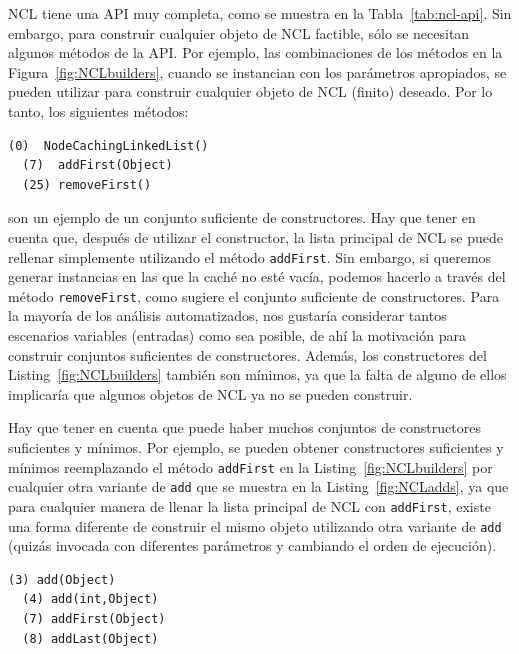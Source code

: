 NCL tiene una API muy completa, como se muestra en la Tabla~\ref{tab:ncl-api}. Sin embargo, para construir cualquier objeto de NCL factible, sólo se necesitan algunos métodos de la API. Por ejemplo, las combinaciones de los métodos en la Figura~\ref{fig:NCLbuilders}, cuando se instancian con los parámetros apropiados, se pueden utilizar para construir cualquier objeto de NCL (finito) deseado. Por lo tanto, los siguientes métodos:
\\
\begin{lstlisting}[numbers=none,label=fig:NCLbuilders, caption=Conjunto de metodos sufiente para NCL]
  (0)  NodeCachingLinkedList()
  (7)  addFirst(Object)
  (25) removeFirst()
\end{lstlisting}


 son un ejemplo de un conjunto suficiente de constructores. Hay que tener en cuenta que, después de utilizar el constructor, la lista principal de NCL se puede rellenar simplemente utilizando el método \texttt{addFirst}. Sin embargo, si queremos generar instancias en las que la caché no esté vacía, podemos hacerlo a través del método \texttt{removeFirst}, como sugiere el conjunto suficiente de constructores. Para la mayoría de los análisis automatizados, nos gustaría considerar tantos escenarios variables (entradas) como sea posible, de ahí la motivación para construir conjuntos suficientes de constructores. Además, los constructores del Listing~\ref{fig:NCLbuilders} también son mínimos, ya que la falta de alguno de ellos implicaría que algunos objetos de NCL ya no se pueden construir.

Hay que tener en cuenta que puede haber muchos conjuntos de constructores suficientes y mínimos. Por ejemplo, se pueden obtener constructores suficientes y mínimos reemplazando el método \texttt{addFirst} en la Listing~\ref{fig:NCLbuilders} por cualquier otra variante de \texttt{add} que se muestra en la Listing~\ref{fig:NCLadds}, ya que para cualquier manera de llenar la lista principal de NCL con \texttt{addFirst}, existe una forma diferente de construir el mismo objeto utilizando otra variante de \texttt{add} (quizás invocada con diferentes parámetros y cambiando el orden de ejecución).
\\
\begin{lstlisting}[numbers=none,label=fig:NCLadds, caption=Variantes del método 'Add' que puedo ser utilizado para rellanar la lista principal en NCL, captionpos=b, frame=tb , basicstyle=\scriptsize]
  (3) add(Object)
  (4) add(int,Object)
  (7) addFirst(Object)
  (8) addLast(Object)
\end{lstlisting}


